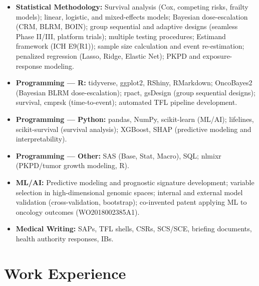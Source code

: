 \documentclass[11pt,a4paper]{moderncv}
\begin{document}
\begin{itemize}
  \item \textbf{Statistical Methodology:} Survival analysis (Cox, competing risks, frailty models); linear, logistic, and mixed-effects models; Bayesian dose-escalation (CRM, BLRM, BOIN); group sequential and adaptive designs (seamless Phase II/III, platform trials); multiple testing procedures; Estimand framework (ICH E9(R1)); sample size calculation and event re-estimation; penalized regression (Lasso, Ridge, Elastic Net); PKPD and exposure-response modeling.
  \item \textbf{Programming --- R:} tidyverse, ggplot2, RShiny, RMarkdown; OncoBayes2 (Bayesian BLRM dose-escalation); rpact, gsDesign (group sequential designs); survival, cmprsk (time-to-event); automated TFL pipeline development.
  \item \textbf{Programming --- Python:} pandas, NumPy, scikit-learn (ML/AI); lifelines, scikit-survival (survival analysis); XGBoost, SHAP (predictive modeling and interpretability).
  \item \textbf{Programming --- Other:} SAS (Base, Stat, Macro), SQL; nlmixr (PKPD/tumor growth modeling, R).
  \item \textbf{ML/AI:} Predictive modeling and prognostic signature development; variable selection in high-dimensional genomic spaces; internal and external model validation (cross-validation, bootstrap); co-invented patent applying ML to oncology outcomes (WO2018002385A1).
  \item \textbf{Medical Writing:} SAPs, TFL shells, CSRs, SCS/SCE, briefing documents, health authority responses, IBs.
\end{itemize}

\section{Work Experience}

\end{document}
